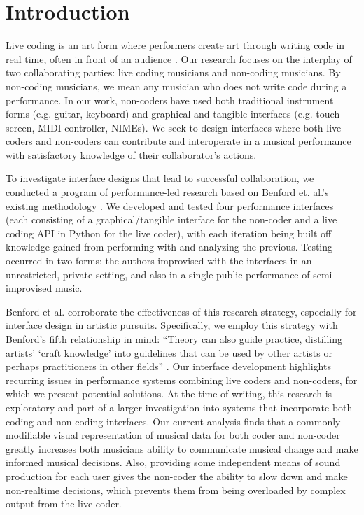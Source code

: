 \documentclass{nime-alternate}
\begin{document}

\printccsdesc

\section{Introduction}
Live coding is an art form where performers create art through writing code in real time, often in front of an audience \cite{collins_live_2003}. Our research focuses on the interplay of two collaborating parties: live coding musicians and non-coding musicians. By non-coding musicians, we mean any musician who does not write code during a performance. In our work, non-coders have used both traditional instrument forms (e.g. guitar, keyboard) and graphical and tangible interfaces (e.g. touch screen, MIDI controller, NIMEs). We seek to design interfaces where both live coders and non-coders can contribute and interoperate in a musical performance with satisfactory knowledge of their collaborator's actions. 

To investigate interface designs that lead to successful collaboration, we conducted a program of performance-led research based on Benford et. al.'s existing methodology \cite{benford_performance-led_2013}. We developed and tested four performance interfaces (each consisting of a graphical/tangible interface for the non-coder and a live coding API in Python for the live coder), with each iteration being built off knowledge gained from performing with and analyzing the previous. Testing occurred in two forms: the authors improvised with the interfaces in an unrestricted, private setting, and also in a single public performance of semi-improvised music.

Benford et al. \cite{benford_performance-led_2013} corroborate the effectiveness of this research strategy, especially for interface design in artistic pursuits. Specifically, we employ this strategy with Benford's fifth relationship in mind: ``Theory can also guide practice, distilling artists' `craft knowledge' into guidelines that can be used by other artists or perhaps practitioners in other fields'' \cite{benford_performance-led_2013}. Our interface development highlights recurring issues in performance systems combining live coders and non-coders, for which we present potential solutions. At the time of writing, this research is exploratory and part of a larger investigation into systems that incorporate both coding and non-coding interfaces. Our current analysis finds that a commonly modifiable visual representation of musical data for both coder and non-coder greatly increases both musicians ability to communicate musical change and make informed musical decisions. Also, providing some independent means of sound production for each user gives the non-coder the ability to slow down and make non-realtime decisions, which prevents them from being overloaded by complex output from the live coder.
\end{document}
